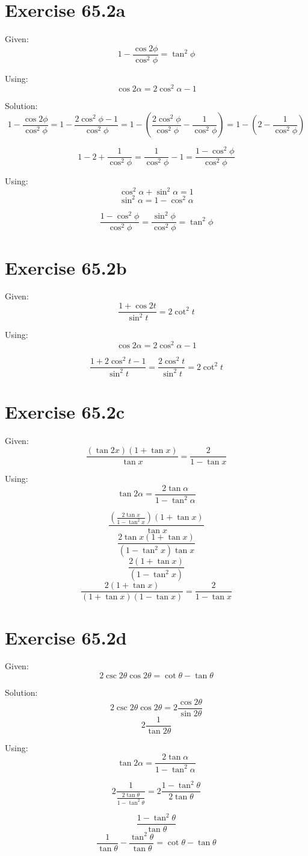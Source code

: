 \documentclass[a4paper, 10pt]{scrartcl}
\begin{document}
\section{Exercise 65.2a}

Given:
\[1 - \frac{\cos{2\phi}}{\cos^{2}{\phi}} = \tan^{2}{\phi}\]

Using:
\[\cos{2\alpha} = 2\cos^{2}{\alpha} - 1\]

Solution:
\[1 - \frac{\cos{2\phi}}{\cos^{2}{\phi}} = 1 - \frac{2\cos^{2}{\phi} - 1}{\cos^{2}{\phi}} =
1 - \left(\frac{2\cos^{2}{\phi}}{\cos^{2}{\phi}} - \frac{1}{\cos^{2}{\phi}}\right) =
1 - (2 - \frac{1}{\cos^{2}{\phi}})\]

\[1 - 2 + \frac{1}{\cos^{2}{\phi}} =
\frac{1}{\cos^{2}{\phi}} - 1 =
\frac{1 - \cos^{2}{\phi}}{\cos^{2}{\phi}}\]

Using:
\[\cos^{2}{\alpha} + \sin^{2}{\alpha} = 1\]
\[\sin^{2}{\alpha} = 1 - \cos^{2}{\alpha}\]

\[\frac{1 - \cos^{2}{\phi}}{\cos^{2}{\phi}} = \frac{\sin^{2}{\phi}}{\cos^{2}{\phi}} =
\tan^{2}{\phi}\]

\section{Exercise 65.2b}

Given:
\[\frac{1 + \cos{2t}}{\sin^{2}{t}} = 2\cot^{2}{t}\]

Using:
\[\cos{2\alpha} = 2\cos^{2}{\alpha} - 1\]

\[\frac{1 + 2\cos^{2}{t} - 1}{\sin^{2}{t}} = \frac{2\cos^{2}{t}}{\sin^{2}{t}} = 2\cot^{2}{t}\]

\section{Exercise 65.2c}

Given:
\[\frac{(\tan{2x})(1 + \tan{x})}{\tan{x}} = \frac{2}{1 - \tan{x}}\]

Using:
\[\tan{2\alpha} = \frac{2\tan{\alpha}}{1 - \tan^{2}{\alpha}}\]

\[\frac{(\frac{2\tan{x}}{1 - \tan^{2}{x}})(1 + \tan{x})}{\tan{x}}\]
\[\frac{2\tan{x}(1 + \tan{x})}{(1 - \tan^{2}{x})\tan{x}}\]
\[\frac{2(1 + \tan{x})}{(1 - \tan^{2}{x})}\]
\[\frac{2(1 + \tan{x})}{(1 + \tan{x})(1 - \tan{x})} = \frac{2}{1 - \tan{x}}\]

\section{Exercise 65.2d}

Given:
\[2\csc{2\theta}\cos{2\theta} = \cot{\theta} - \tan{\theta}\]

Solution:
\[2\csc{2\theta}\cos{2\theta} = 2\frac{\cos{2\theta}}{\sin{2\theta}}\]
\[2\frac{1}{\tan{2\theta}}\]

Using:
\[\tan{2\alpha} = \frac{2\tan{\alpha}}{1 - \tan^{2}{\alpha}}\]

\[2\frac{1}{\frac{2\tan{\theta}}{1 - \tan^{2}{\theta}}} =
2\frac{1 - \tan^{2}{\theta}}{2\tan{\theta}}\]

\[\frac{1 - \tan^{2}{\theta}}{\tan{\theta}}\]
\[\frac{1}{\tan{\theta}} - \frac{\tan^{2}{\theta}}{\tan{\theta}} =
\cot{\theta} - \tan{\theta}\]
\end{document}
